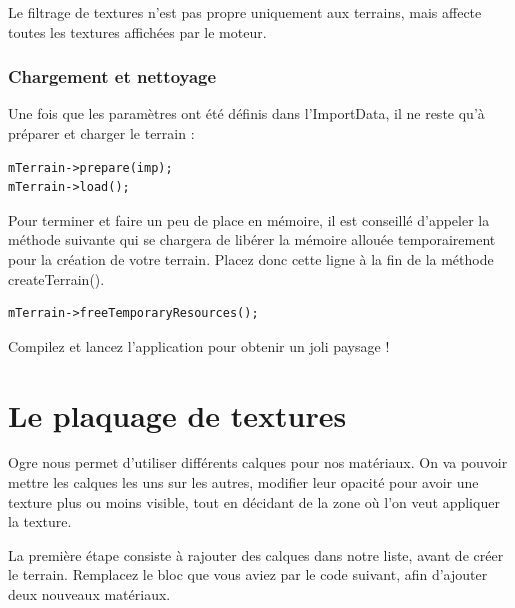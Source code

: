 Le filtrage de textures n'est pas propre uniquement aux terrains, mais affecte toutes les textures affichées par le moteur.


\subsubsection{Chargement et nettoyage}


Une fois que les paramètres ont été définis dans l'ImportData, il ne reste qu'à préparer et charger le terrain :

\begin{lstlisting}[caption={Préparation et chargement du terrain}]
mTerrain->prepare(imp);
mTerrain->load();
\end{lstlisting}

Pour terminer et faire un peu de place en mémoire, il est conseillé d'appeler la méthode suivante qui se chargera de libérer la mémoire allouée temporairement pour la création de votre terrain. Placez donc cette ligne à la fin de la méthode createTerrain().

\begin{lstlisting}[caption={Libération de place en mémoire}]
mTerrain->freeTemporaryResources();
\end{lstlisting}

Compilez et lancez l'application pour obtenir un joli paysage !







\section{Le plaquage de textures}


Ogre nous permet d'utiliser différents calques pour nos matériaux. On va pouvoir mettre les calques les uns sur les autres, modifier leur opacité pour avoir une texture plus ou moins visible, tout en décidant de la zone où l'on veut appliquer la texture.

La première étape consiste à rajouter des calques dans notre liste, avant de créer le terrain. Remplacez le bloc que vous aviez par le code suivant, afin d'ajouter deux nouveaux matériaux.



